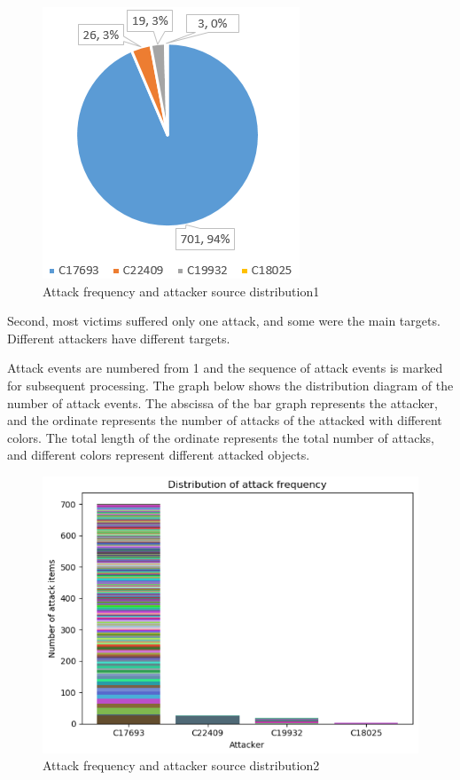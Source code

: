 \documentclass[12pt,journal,draftcls,doublespace, letterpaper,onecolumn]{IEEEtran}
\begin{document}
\begin{figure}[htpb]
	\centering
	\includegraphics []{3.png}
	\caption{Attack frequency and attacker source distribution1}
	\label{fig}
\end{figure}



Second, most victims suffered only one attack, and some were the main targets. Different attackers have different targets. 

Attack events are numbered from 1 and the sequence of attack events is marked for subsequent processing. The graph below shows the distribution diagram of the number of attack events. The abscissa of the bar graph represents the attacker, and the ordinate represents the number of attacks of the attacked with different colors. The total length of the ordinate represents the total number of attacks, and different colors represent different attacked objects.

\begin{figure}[htpb]
	\centering
	\includegraphics []{6.png}
	\caption{Attack frequency and attacker source distribution2}
	\label{fig}
\end{figure}
\end{document}

